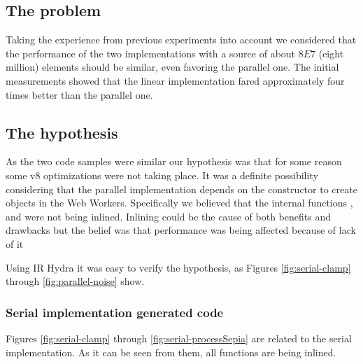 \subsection{The problem}
Taking the experience from previous experiments into account we considered that the performance of the two implementations with a source  of about \(8E7\) (eight million) elements should be similar, even favoring the parallel one. The initial measurements showed that the linear implementation fared approximately four times better than the parallel one.

\subsection{The hypothesis}
As the two code samples were similar our hypothesis was that for some reason some v8 optimizations were not taking place. It was a definite possibility considering that the parallel implementation depends on the \tfunction{} constructor to create \tfunction{} objects in the Web Workers. Specifically we believed that the internal functions ,  and  were not being inlined. Inlining could be the cause of both benefits\cite{inline-pro} and drawbacks\cite{inline-cons} but the belief was that performance was being affected because of lack of it

Using IR Hydra it was easy to verify the hypothesis, as Figures \ref{fig:serial-clamp} through \ref{fig:parallel-noise} show.


\subsubsection{Serial implementation generated code}
Figures \ref{fig:serial-clamp} through \ref{fig:serial-processSepia} are related to the serial implementation. As it can be seen from them, all functions are being inlined.

